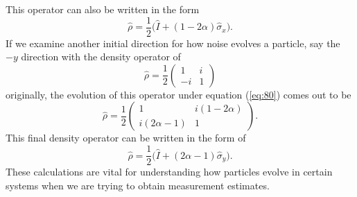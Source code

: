 \documentclass[twocolumn]{article}
\begin{document}
This operator can also be written in the form
\begin{equation} \label{eq:83}
\hat{\rho}=\frac{1}{2}\big(\hat{I}+(1-2\alpha)\hat{\sigma}_x\big).
\end{equation}
If we examine another initial direction for how noise evolves a particle, say the $-y$ direction with the density operator of 
\begin{equation} \label{eq:84}
\hat{\rho}=\frac{1}{2}
\begin{pmatrix}
1 & i \\
-i & 1
\end{pmatrix}
\end{equation}
originally, the evolution of this operator under equation (\ref{eq:80}) comes out to be
\begin{equation} \label{eq:85}
\hat{\rho}=\frac{1}{2}
\begin{pmatrix}
1 & i(1-2\alpha) \\
i(2\alpha-1) & 1
\end{pmatrix}.
\end{equation}
This final density operator can be written in the form of 
\begin{equation} \label{eq:86}
\hat{\rho}=\frac{1}{2}\big(\hat{I}+(2\alpha-1)\hat{\sigma}_y\big).
\end{equation}
These calculations are vital for understanding how particles evolve in certain systems when we are trying to obtain measurement estimates. 
\end{document}
